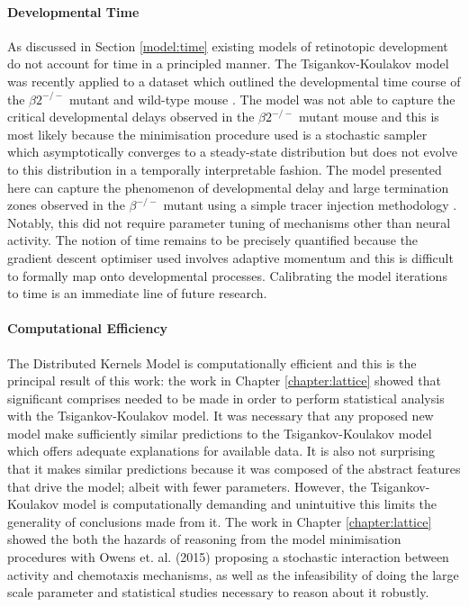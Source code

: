 \paragraph{Developmental Time}
As discussed in Section \ref{model:time} existing models of retinotopic development do not account for time in a principled manner. The Tsigankov-Koulakov model was recently applied to a dataset which outlined the developmental time course of the $\beta2^{-/-}$ mutant and wild-type mouse \cite{Lyngholm2019-fs}. The model was not able to capture the critical developmental delays observed in the $\beta2^{-/-}$ mutant mouse and this is most likely because the minimisation procedure used is a stochastic sampler which asymptotically converges to a steady-state distribution but does not evolve to this distribution in a temporally interpretable fashion. The model presented here can capture the phenomenon of developmental delay and large termination zones observed in the $\beta^{-/-}$ mutant using a simple tracer injection methodology \cite{Lyngholm2019-fs, McLaughlin2003-yy}. Notably, this did not require parameter tuning of mechanisms other than neural activity. The notion of time remains to be precisely quantified because the gradient descent optimiser used involves adaptive momentum and this is difficult to formally map onto developmental processes. Calibrating the model iterations to time is an immediate line of future research. 
\paragraph{Computational Efficiency}
The Distributed Kernels Model is computationally efficient and this is the principal result of this work: the work in Chapter \ref{chapter:lattice} showed that significant comprises needed to be made in order to perform statistical analysis with the Tsigankov-Koulakov model. It was necessary that any proposed new model make sufficiently similar predictions to the Tsigankov-Koulakov model which offers adequate explanations for available data. It is also not surprising that it makes similar predictions because it was composed of the abstract features that drive the model; albeit with fewer parameters. However, the Tsigankov-Koulakov model is computationally demanding and unintuitive this limits the generality of conclusions made from it. The work in Chapter \ref{chapter:lattice} showed the both the hazards of reasoning from the model minimisation procedures with Owens et. al. (2015) proposing a stochastic interaction between activity and chemotaxis mechanisms, as well as the infeasibility of doing the large scale parameter and statistical studies necessary to reason about it robustly. 

